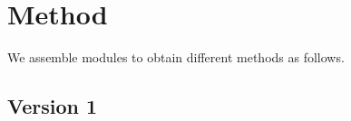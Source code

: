 \documentclass[12pt]{article}
\numberwithin{equation}{section}
\begin{document}
%
%
%
%


%
%






\section{Method}

We assemble modules to obtain different methods as follows.

\subsection{Version 1}
\end{document}
